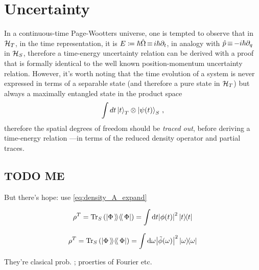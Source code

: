 \section{Uncertainty}

In a continuous-time Page-Wootters universe,
one is tempted to observe that in $\mathcal{H}_T$,
in the time representation, it is $E \coloneqq \hbar\hat{\Omega} \operatorname*{\equiv} i\hbar\partial_{t}$,
in analogy with $\hat{p} \operatorname*{\equiv} -i\hbar\partial_{q}$ in $\mathcal{H}_S$,
therefore a time-energy uncertainty relation can be derived
with a proof that is formally identical to the well known
position-momentum uncertainty relation. However, it's worth
noting that the time evolution of a system is never expressed
in terms of a separable state (and therefore a pure state in $\mathcal{H}_T$)
but always a maximally entangled state in the product space
\begin{equation*}
  \int dt \ket{t}_T \otimes \ket{\psi(t)}_S \, \text{,}
\end{equation*}
therefore the spatial degrees of freedom should be \emph{traced out},
before deriving a time-energy relation 
---in terms of the reduced density operator and partial traces.

\subsection{TODO ME}

But there's hope: use \eqref{eq:density_A_expand}

\[
  \rho^T = \Tr_S\qty(\left| \Phi \left\rangle\!\left\rangle \right\langle\!\right\langle \Phi \right|) = \int \dd t \abs{\phi(t)}^2 \ketbra{t}{t} 
\]

\[
  \rho^T = \Tr_S\qty(\left| \Phi \left\rangle\!\left\rangle \right\langle\!\right\langle \Phi \right|) = \int \dd \omega \abs{\tilde{\phi}(\omega)}^2 \ketbra{\omega}{\omega} 
\]

They're clasical prob. ; proerties of Fourier etc.
